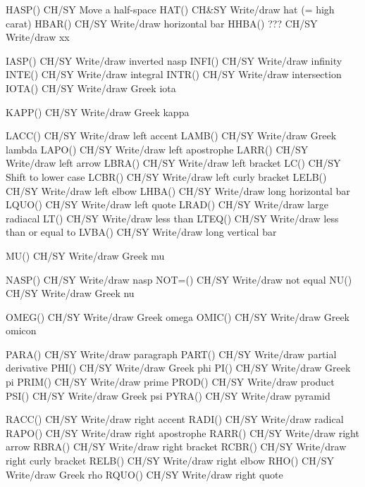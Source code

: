 HASP()                      CH/SY Move a half-space
HAT()                       CH&SY Write/draw hat (= high carat)
HBAR()                      CH/SY Write/draw horizontal bar
HHBA()  ???                 CH/SY Write/draw xx

IASP()                      CH/SY Write/draw inverted nasp
INFI()                      CH/SY Write/draw infinity
INTE()                      CH/SY Write/draw integral
INTR()                      CH/SY Write/draw intersection
IOTA()                      CH/SY Write/draw Greek iota

KAPP()                      CH/SY Write/draw Greek kappa

LACC()                      CH/SY Write/draw left accent
LAMB()                      CH/SY Write/draw Greek lambda
LAPO()                      CH/SY Write/draw left apostrophe
LARR()                      CH/SY Write/draw left arrow
LBRA()                      CH/SY Write/draw left bracket
LC()                        CH/SY Shift to lower case
LCBR()                      CH/SY Write/draw left curly bracket
LELB()                      CH/SY Write/draw left elbow
LHBA()                      CH/SY Write/draw long horizontal bar
LQUO()                      CH/SY Write/draw left quote
LRAD()                      CH/SY Write/draw large radiacal
LT()                        CH/SY Write/draw less than
LTEQ()                      CH/SY Write/draw less than or equal to
LVBA()                      CH/SY Write/draw long vertical bar

MU()                        CH/SY Write/draw Greek mu

NASP()                      CH/SY Write/draw nasp
NOT=()                      CH/SY Write/draw not equal
NU()                        CH/SY Write/draw Greek nu

OMEG()                      CH/SY Write/draw Greek omega
OMIC()                      CH/SY Write/draw Greek omicon

PARA()                      CH/SY Write/draw paragraph
PART()                      CH/SY Write/draw partial derivative
PHI()                       CH/SY Write/draw Greek phi
PI()                        CH/SY Write/draw Greek pi
PRIM()                      CH/SY Write/draw prime
PROD()                      CH/SY Write/draw product
PSI()                       CH/SY Write/draw Greek psi
PYRA()                      CH/SY Write/draw pyramid

RACC()                      CH/SY Write/draw right accent
RADI()                      CH/SY Write/draw radical
RAPO()                      CH/SY Write/draw right apostrophe
RARR()                      CH/SY Write/draw right arrow
RBRA()                      CH/SY Write/draw right bracket
RCBR()                      CH/SY Write/draw right curly bracket
RELB()                      CH/SY Write/draw right elbow
RHO()                       CH/SY Write/draw Greek rho
RQUO()                      CH/SY Write/draw right quote

